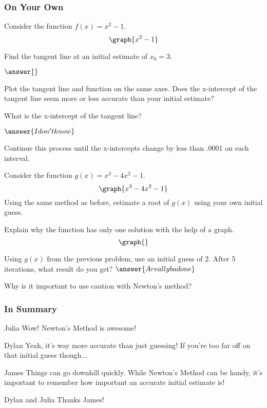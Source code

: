 \documentclass{ximera}
\begin{document}
\subsubsection{On Your Own}
\begin{question}
Consider the function $f(x) = x^2-1$.
\[
\graph{x^2-1}
\]

Find the tangent line at an initial estimate of $x_0=3$.

$\answer{}$

Plot the tangent line and function on the same axes. Does the x-intercept of the tangent line seem more or less accurate than your initial estimate?

\begin{multipleChoice}
\end{multipleChoice}

What is the x-intercept of the tangent line?

$\answer{I don't know}$

Continue this process until the x-intercepts change by less than .0001 on each interval.
\end{question}
Consider the function $g(x) = x^3-4x^2-1$.
\[
\graph{x^3-4x^2-1}
\]
Using the same method as before, estimate a root of $g(x)$ using your own initial guess.

Explain why the function has only one solution with the help of a graph.
\[
\graph{}
\]
\begin{freeResponse}
\end{freeResponse}
Using $g(x)$ from the previous problem, use an initial guess of 2. After 5 iterations, what result do you get?
$\answer{A really bad one}$

Why is it important to use caution with Newton's method?
\begin{freeResponse}
\end{freeResponse}
\subsubsection{In Summary}
\begin{dialogue}
\item[Julia] Wow! Newton's Method is awesome!
\item[Dylan] Yeah, it's way more accurate than just guessing! If you're too far off on that initial guess though...
\item[James] Things can go downhill quickly. While Newton's Method can be handy, it's important to remember how important an accurate initial estimate is!
\item[Dylan and Julia] Thanks James!
\end{dialogue}
\end{document}
